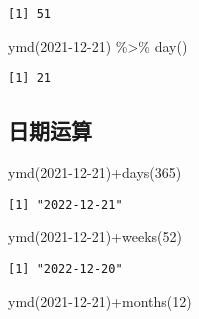 \documentclass[
  letterpaper,
  DIV=11,
  numbers=noendperiod]{scrreprt}
\newenvironment{Shaded}{\begin{snugshade}}{\end{snugshade}}
\newcommand{\DecValTok}[1]{\textcolor[rgb]{0.68,0.00,0.00}{#1}}
\newcommand{\FunctionTok}[1]{\textcolor[rgb]{0.28,0.35,0.67}{#1}}
\newcommand{\NormalTok}[1]{\textcolor[rgb]{0.00,0.23,0.31}{#1}}
\newcommand{\SpecialCharTok}[1]{\textcolor[rgb]{0.37,0.37,0.37}{#1}}
\newcommand{\StringTok}[1]{\textcolor[rgb]{0.13,0.47,0.30}{#1}}
\begin{document}
\begin{verbatim}
[1] 51
\end{verbatim}

\begin{Shaded}
\begin{Highlighting}[]
\FunctionTok{ymd}\NormalTok{(}\StringTok{\textquotesingle{}2021{-}12{-}21\textquotesingle{}}\NormalTok{) }\SpecialCharTok{\%\textgreater{}\%} \FunctionTok{day}\NormalTok{()}
\end{Highlighting}
\end{Shaded}

\begin{verbatim}
[1] 21
\end{verbatim}

\subsection{日期运算}\label{ux65e5ux671fux8fd0ux7b97}

\begin{Shaded}
\begin{Highlighting}[]
\FunctionTok{ymd}\NormalTok{(}\StringTok{\textquotesingle{}2021{-}12{-}21\textquotesingle{}}\NormalTok{)}\SpecialCharTok{+}\FunctionTok{days}\NormalTok{(}\DecValTok{365}\NormalTok{)}
\end{Highlighting}
\end{Shaded}

\begin{verbatim}
[1] "2022-12-21"
\end{verbatim}

\begin{Shaded}
\begin{Highlighting}[]
\FunctionTok{ymd}\NormalTok{(}\StringTok{\textquotesingle{}2021{-}12{-}21\textquotesingle{}}\NormalTok{)}\SpecialCharTok{+}\FunctionTok{weeks}\NormalTok{(}\DecValTok{52}\NormalTok{)}
\end{Highlighting}
\end{Shaded}

\begin{verbatim}
[1] "2022-12-20"
\end{verbatim}

\begin{Shaded}
\begin{Highlighting}[]
\FunctionTok{ymd}\NormalTok{(}\StringTok{\textquotesingle{}2021{-}12{-}21\textquotesingle{}}\NormalTok{)}\SpecialCharTok{+}\FunctionTok{months}\NormalTok{(}\DecValTok{12}\NormalTok{)}
\end{Highlighting}
\end{Shaded}
\end{document}
